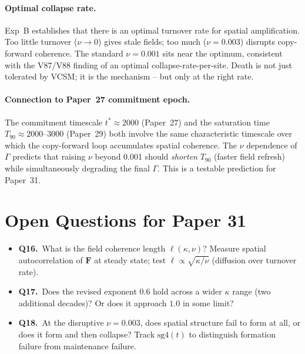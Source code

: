 \documentclass[11pt,a4paper]{article}
\begin{document}
\paragraph{Optimal collapse rate.}
Exp~B establishes that there is an optimal turnover rate for spatial amplification.
Too little turnover ($\nu \to 0$) gives stale fields; too much ($\nu=0.003$) disrupts
copy-forward coherence.  The standard $\nu=0.001$ sits near the optimum, consistent
with the V87/V88 finding of an optimal collapse-rate-per-site.  Death is not just
tolerated by VCSM; it is the mechanism -- but only at the right rate.

\paragraph{Connection to Paper~27 commitment epoch.}
The commitment timescale $t^* \approx 2000$ (Paper~27) and the saturation time
$T_{90} \approx 2000$--$3000$ (Paper~29) both involve the same characteristic
timescale over which the copy-forward loop accumulates spatial coherence.  The
$\nu$ dependence of $\Gamma$ predicts that raising $\nu$ beyond 0.001 should
\emph{shorten} $T_{90}$ (faster field refresh) while simultaneously degrading
the final $\Gamma$.  This is a testable prediction for Paper~31.

\section{Open Questions for Paper 31}
\label{sec:openq}

\begin{itemize}
  \item \textbf{Q16.}\ What is the field coherence length $\ell(\kappa, \nu)$?
    Measure spatial autocorrelation of $\mathbf{F}$ at steady state;
    test $\ell \propto \sqrt{\kappa/\nu}$ (diffusion over turnover rate).
  \item \textbf{Q17.}\ Does the revised exponent $0.6$ hold across a wider $\kappa$
    range (two additional decades)?  Or does it approach $1.0$ in some limit?
  \item \textbf{Q18.}\ At the disruptive $\nu=0.003$, does spatial structure fail to
    form at all, or does it form and then collapse?  Track $\mathrm{sg4}(t)$ to
    distinguish formation failure from maintenance failure.
\end{itemize}
\end{document}
